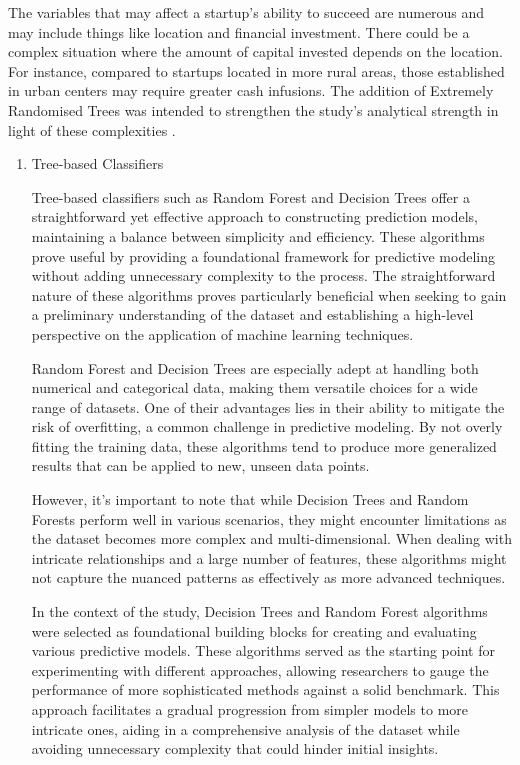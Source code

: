 \documentclass[12pt]{article}
\begin{document}
The variables that may affect a startup's ability to succeed are numerous and may include things like location and financial investment. There could be a complex situation where the amount of capital invested depends on the location. For instance, compared to startups located in more rural areas, those established in urban centers may require greater cash infusions. The addition of Extremely Randomised Trees was intended to strengthen the study's analytical strength in light of these complexities \citep{geurts2006extremely}.

\begin{enumerate}
    \item Tree-based Classifiers

Tree-based classifiers such as Random Forest and Decision Trees offer a straightforward yet effective approach to constructing prediction models, maintaining a balance between simplicity and efficiency. These algorithms prove useful by providing a foundational framework for predictive modeling without adding unnecessary complexity to the process. The straightforward nature of these algorithms proves particularly beneficial when seeking to gain a preliminary understanding of the dataset and establishing a high-level perspective on the application of machine learning techniques.

Random Forest and Decision Trees are especially adept at handling both numerical and categorical data, making them versatile choices for a wide range of datasets. One of their advantages lies in their ability to mitigate the risk of overfitting, a common challenge in predictive modeling. By not overly fitting the training data, these algorithms tend to produce more generalized results that can be applied to new, unseen data points.

However, it's important to note that while Decision Trees and Random Forests perform well in various scenarios, they might encounter limitations as the dataset becomes more complex and multi-dimensional. When dealing with intricate relationships and a large number of features, these algorithms might not capture the nuanced patterns as effectively as more advanced techniques.

In the context of the study, Decision Trees and Random Forest algorithms were selected as foundational building blocks for creating and evaluating various predictive models. These algorithms served as the starting point for experimenting with different approaches, allowing researchers to gauge the performance of more sophisticated methods against a solid benchmark. This approach facilitates a gradual progression from simpler models to more intricate ones, aiding in a comprehensive analysis of the dataset while avoiding unnecessary complexity that could hinder initial insights.


\end{enumerate}
\end{document}
